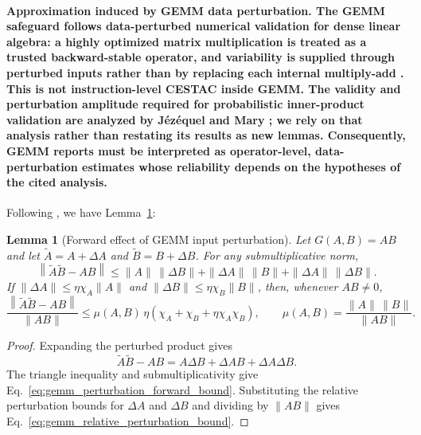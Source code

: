 \documentclass[manuscript, screen]{acmart}
\newtheorem{lemma}[theorem]{Lemma}
\begin{document}
\paragraph{Approximation induced by GEMM data perturbation.
The GEMM safeguard follows data-perturbed numerical validation for dense linear algebra: a highly optimized matrix multiplication is treated as a trusted backward-stable operator, and variability is supplied through perturbed inputs rather than by replacing each internal multiply-add \citep{jezequel2020trustworthy, jezequel2024innerproducts}. This is not instruction-level CESTAC inside GEMM. The validity and perturbation amplitude required for probabilistic inner-product validation are analyzed by Jézéquel and Mary \cite{jezequel2024innerproducts}; we rely on that analysis rather than restating its results as new lemmas. Consequently, GEMM reports must be interpreted as operator-level, data-perturbation estimates whose reliability depends on the hypotheses of the cited analysis.} Following \cite[Chp. 4]{higham2002accuracy}, we have Lemma~\ref{lem:gemm-perturbation-forward}:
\begin{lemma}[Forward effect of GEMM input perturbation]
\label{lem:gemm-perturbation-forward}
Let $G(A,B)=AB$ and let $\widetilde{A}=A+\Delta A$ and
$\widetilde{B}=B+\Delta B$. For any submultiplicative norm,
\begin{equation}
\left\|\widetilde{A}\widetilde{B}-AB\right\|
\le
\|A\|\,\|\Delta B\|
+
\|\Delta A\|\,\|B\|
+
\|\Delta A\|\,\|\Delta B\|.
\label{eq:gemm_perturbation_forward_bound}
\end{equation}
If $\|\Delta A\|\le \eta \chi_A\|A\|$ and
$\|\Delta B\|\le \eta \chi_B\|B\|$, then, whenever $AB\ne0$,
\begin{equation}
\frac{\left\|\widetilde{A}\widetilde{B}-AB\right\|}{\|AB\|}
\le
\mu(A,B)\,
\eta\left(\chi_A+\chi_B+\eta\chi_A\chi_B\right),
\qquad
\mu(A,B)=\frac{\|A\|\,\|B\|}{\|AB\|}.
\label{eq:gemm_relative_perturbation_bound}
\end{equation}
\end{lemma}

\begin{proof}
Expanding the perturbed product gives
\[
\widetilde{A}\widetilde{B}-AB
=A\Delta B+\Delta A B+\Delta A\Delta B.
\]
The triangle inequality and submultiplicativity give
Eq.~\eqref{eq:gemm_perturbation_forward_bound}. Substituting the
relative perturbation bounds for $\Delta A$ and $\Delta B$ and dividing
by $\|AB\|$ gives Eq.~\eqref{eq:gemm_relative_perturbation_bound}.
\end{proof}
\end{document}
